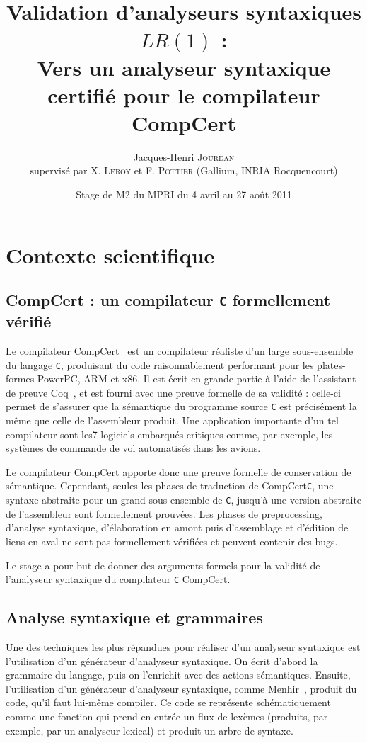\documentclass[a4paper,11pt]{article}
\title{Validation d'analyseurs syntaxiques $LR(1)$ :\\
  {\Large Vers un analyseur syntaxique certifié pour le compilateur CompCert}}
\author{
  Jacques-Henri \textsc{Jourdan}\\
  {\normalsize supervisé par X. \textsc{Leroy} et F. \textsc{Pottier} (Gallium, INRIA Rocquencourt)}}
\date{Stage de M2 du MPRI du 4 avril au 27 août 2011}
\begin{document}
\maketitle

\section{Contexte scientifique}

\subsection{CompCert : un compilateur \texttt{C} formellement vérifié}

Le compilateur CompCert~\cite{compcert} est un compilateur réaliste
d'un large sous-ensemble du langage \texttt{C}, produisant du code
raisonnablement performant pour les plates-formes PowerPC, ARM et
x86. Il est écrit en grande partie à l'aide de l'assistant de preuve
Coq~\cite{coq}, et est fourni avec une preuve formelle de sa validité :
celle-ci permet de s'assurer que la sémantique du programme source
\texttt{C} est précisément la même que celle de l'assembleur
produit. Une application importante d'un tel compilateur sont les7
logiciels embarqués critiques comme, par exemple, les systèmes de
commande de vol automatisés dans les avions.

Le compilateur CompCert apporte donc une preuve formelle de
conservation de sémantique. Cependant, seules les phases de traduction
de CompCert\texttt{C}, une syntaxe abstraite pour un grand
sous-ensemble de \texttt{C}, jusqu'à une version abstraite de
l'assembleur sont formellement prouvées. Les phases de preprocessing,
d'analyse syntaxique, d'élaboration en amont puis d'assemblage et
d'édition de liens en aval ne sont pas formellement vérifiées et
peuvent contenir des bugs.

Le stage a pour but de donner des arguments formels pour la validité
de l'analyseur syntaxique du compilateur \texttt{C} CompCert.

\subsection{Analyse syntaxique et grammaires}

Une des techniques les plus répandues pour réaliser d'un analyseur
syntaxique est l'utilisation d'un générateur d'analyseur
syntaxique. On écrit d'abord la grammaire du langage, puis on
l'enrichit avec des actions sémantiques. Ensuite, l'utilisation d'un
générateur d'analyseur syntaxique, comme Menhir~\cite{menhir}, produit
du code, qu'il faut lui-même compiler. Ce code se représente
schématiquement comme une fonction qui prend en entrée un flux de
lexèmes (produits, par exemple, par un analyseur lexical) et produit
un arbre de syntaxe.
\end{document}
